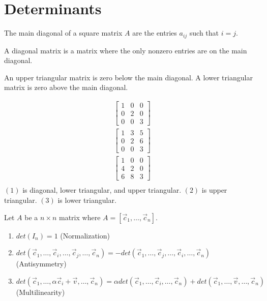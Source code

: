 \chapter{Determinants}

\begin{definition}
    The main diagonal of a square matrix $A$ are the entries $a_{ij}$ such that $i=j$.
\end{definition}
\begin{definition}
    A diagonal matrix is a matrix where the only nonzero entries are on the main diagonal.
\end{definition}
\begin{definition}
    An upper triangular matrix is zero below the main diagonal. A lower triangular matrix is zero above the main diagonal.
\end{definition}
\begin{example}
    \begin{align*}
        \begin{bmatrix}
            1 & 0 & 0 \\
            0 & 2 & 0 \\
            0 & 0 & 3
        \end{bmatrix}\tag{1}\\
        \begin{bmatrix}
            1 & 3 & 5 \\
            0 & 2 & 6 \\
            0 & 0 & 3
        \end{bmatrix}\tag{2}\\
        \begin{bmatrix}
            1 & 0 & 0 \\
            4 & 2 & 0 \\
            6 & 8 & 3
        \end{bmatrix}\tag{3}\\
    \end{align*}
    $(1)$ is diagonal, lower triangular, and upper triangular. $(2)$ is upper triangular. $(3)$ is lower triangular.
\end{example}
Let $A$ be a $n\times n$ matrix where $A=[\vec{c}_1,\ldots,\vec{c}_n]$.
\begin{enumerate}
    \item $det(I_n)=1$ (Normalization)
    \item $det(\vec{c}_1,\ldots,\vec{c}_i,\ldots,\vec{c}_j,\ldots,\vec{c}_n)=-det(\vec{c}_1,\ldots,\vec{c}_j,\ldots,\vec{c}_i,\ldots,\vec{c}_n)$ (Antisymmetry)
    \item $det(\vec{c}_1,\ldots,
    \alpha\vec{c}_i+\vec{v},\ldots,\vec{c}_n)=\alpha det(\vec{c}_1,\ldots,
    \vec{c}_i,\ldots,\vec{c}_n)+det(\vec{c}_1,\ldots,
    \vec{v},\ldots,\vec{c}_n)$ (Multilinearity)
\end{enumerate}
